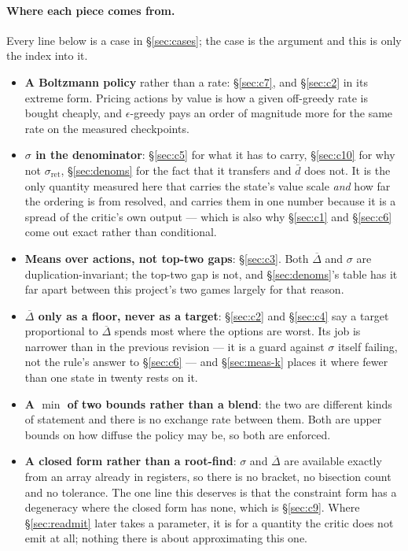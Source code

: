 \documentclass{article}
\newcommand{\gapbar}{\overline{\Delta}}
\newcommand{\dbar}{\bar{d}}
\newcommand{\sret}{\sigma_{\mathrm{ret}}}
\newcommand{\srank}{\sigma}
\begin{document}
\paragraph{Where each piece comes from.} Every line below is a case in \S\ref{sec:cases}; the
case is the argument and this is only the index into it.
\begin{itemize}
  \item \textbf{A Boltzmann policy} rather than a rate: \S\ref{sec:c7}, and \S\ref{sec:c2} in its
  extreme form. Pricing actions by value is how a given off-greedy rate is bought cheaply, and
  $\epsilon$-greedy pays an order of magnitude more for the same rate on the measured
  checkpoints.
  \item \textbf{$\srank$ in the denominator}: \S\ref{sec:c5} for what it has to carry,
  \S\ref{sec:c10} for why not $\sret$, \S\ref{sec:denoms} for the fact that it transfers and
  $\dbar$ does not. It is the only quantity measured here that carries the state's value scale
  \emph{and} how far the ordering is from resolved, and carries them in one number because it is
  a spread of the critic's own output --- which is also why \S\ref{sec:c1} and \S\ref{sec:c6}
  come out exact rather than conditional.
  \item \textbf{Means over actions, not top-two gaps}: \S\ref{sec:c3}. Both $\gapbar$ and
  $\srank$ are duplication-invariant; the top-two gap is not, and \S\ref{sec:denoms}'s table has
  it far apart between this project's two games largely for that reason.
  \item \textbf{$\gapbar$ only as a floor, never as a target}: \S\ref{sec:c2} and \S\ref{sec:c4}
  say a target proportional to $\gapbar$ spends most where the options are worst. Its job is
  narrower than in the previous revision --- it is a guard against $\srank$ itself failing, not
  the rule's answer to \S\ref{sec:c6} --- and \S\ref{sec:meas-k} places it where fewer than one
  state in twenty rests on it.
  \item \textbf{A $\min$ of two bounds rather than a blend}: the two are different kinds of
  statement and there is no exchange rate between them. Both are upper bounds on how diffuse the
  policy may be, so both are enforced.
  \item \textbf{A closed form rather than a root-find}: $\srank$ and $\gapbar$ are available
  exactly from an array already in registers, so there is no bracket, no bisection count and no
  tolerance. The one line this deserves is that the constraint form has a degeneracy where the
  closed form has none, which is \S\ref{sec:c9}. Where \S\ref{sec:readmit} later takes a
  parameter, it is for a quantity the critic does not emit at all; nothing there is about
  approximating this one.
\end{itemize}
\end{document}
